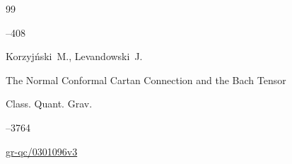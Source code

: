 \begin{thebibliography}{99}

--408






\by  Korzyj\'nski~M., Levandowski~J.

\paper The Normal Conformal Cartan Connection and the Bach Tensor

\jour Class. Quant. Grav.



--3764


\arxiv \href{https://arxiv.org/abs/gr-qc/0301096}{gr-qc/0301096v3}




\end{thebibliography}







%

